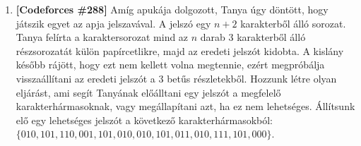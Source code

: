 \documentclass[a4paper,12pt]{article}
\begin{document}
\begin{enumerate}
            \item \textbf{[Codeforces \#288]} Amíg apukája dolgozott, Tanya úgy döntött, hogy játszik egyet az apja jelszavával. A jelszó egy $n+2$ karakterből álló sorozat. Tanya felírta a karaktersorozat mind az $n$ darab $3$ karakterből álló részsorozatát külön papírcetlikre, majd az eredeti jelszót kidobta. A kislány később rájött, hogy ezt nem kellett volna megtennie, ezért megpróbálja visszaállítani az eredeti jelszót a $3$ betűs részletekből. Hozzunk létre olyan eljárást, ami segít Tanyának előálltani egy jelszót a megfelelő karakterhármasoknak, vagy megállapítani azt, ha ez nem lehetséges. Állítsunk elő egy lehetséges jelszót a következő karakterhármasokból: $\{ 010, 101, 110, 001, 101, 010, 010, 101, 011, 010, 111,101, 000 \}$.
        \end{enumerate}
    
\end{document}
